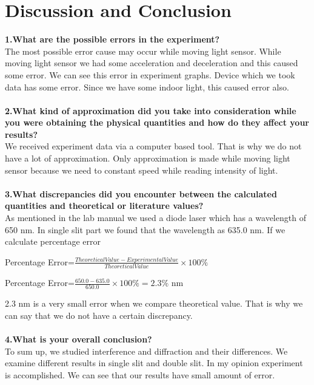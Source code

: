 \documentclass[a4paper,12pt]{report}
\begin{document}
\chapter{Discussion and Conclusion}
\textbf{1.What are the possible errors in the experiment?}\\
The most possible error cause may occur while moving light sensor. While moving light sensor we had some acceleration and deceleration and this caused some error. We can see this error in experiment graphs. Device which we took data has some error. Since we have some indoor light, this caused error also.\\\\
\textbf{2.What kind of approximation did you take into consideration while you were obtaining the physical quantities and how do they affect your results?}\\
We received experiment data via a computer based tool. That is why we do not have a lot of approximation. Only approximation is made while moving light sensor because we need to constant speed while reading intensity of light.\\\\ 
\textbf{3.What discrepancies did you encounter between the calculated quantities and theoretical or literature values?}\\
As mentioned in the lab manual we used a diode laser which has a wavelength of 650 nm. In single slit part we found that the wavelength as 635.0 nm. If we calculate percentage error
\begin{center}
	Percentage Error=$\frac{Theoretical Value-Experimental Value}{Theoretical Value}\times 100\%$
\end{center}
\begin{center}
	Percentage Error=$\frac{650.0-635.0}{650.0}\times 100\%=2.3\%$ nm
\end{center}
2.3 nm is a very small error when we compare theoretical value. That is why we can say that we do not have a certain discrepancy.\\\\ 
\textbf{4.What is your overall conclusion?}\\
To sum up, we studied interference and diffraction and their differences. We examine different results in single slit and double slit. In my opinion experiment is accomplished. We can see that our results have small amount of error. 
\end{document}
